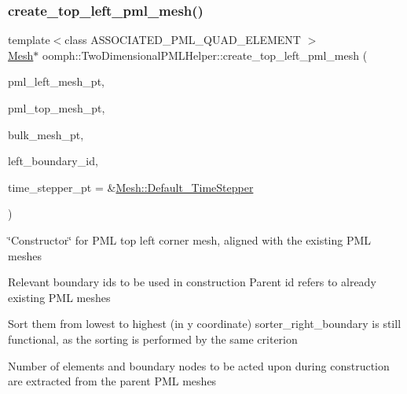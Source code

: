 \mbox{\label{namespaceoomph_1_1TwoDimensionalPMLHelper_a60f24bcfa2ad065577e47d97015995ac}} 
\subsubsection{\texorpdfstring{create\+\_\+top\+\_\+left\+\_\+pml\+\_\+mesh()}{create\_top\_left\_pml\_mesh()}}
{\footnotesize\ttfamily template$<$class A\+S\+S\+O\+C\+I\+A\+T\+E\+D\+\_\+\+P\+M\+L\+\_\+\+Q\+U\+A\+D\+\_\+\+E\+L\+E\+M\+E\+NT $>$ \\
\hyperlink{classoomph_1_1Mesh}{Mesh}$\ast$ oomph\+::\+Two\+Dimensional\+P\+M\+L\+Helper\+::create\+\_\+top\+\_\+left\+\_\+pml\+\_\+mesh (\begin{DoxyParamCaption}\item[{\hyperlink{classoomph_1_1Mesh}{Mesh} $\ast$}]{pml\+\_\+left\+\_\+mesh\+\_\+pt,  }\item[{\hyperlink{classoomph_1_1Mesh}{Mesh} $\ast$}]{pml\+\_\+top\+\_\+mesh\+\_\+pt,  }\item[{\hyperlink{classoomph_1_1Mesh}{Mesh} $\ast$}]{bulk\+\_\+mesh\+\_\+pt,  }\item[{const unsigned \&}]{left\+\_\+boundary\+\_\+id,  }\item[{\hyperlink{classoomph_1_1TimeStepper}{Time\+Stepper} $\ast$}]{time\+\_\+stepper\+\_\+pt = {\ttfamily \&\hyperlink{classoomph_1_1Mesh_a12243d0fee2b1fcee729ee5a4777ea10}{Mesh\+::\+Default\+\_\+\+Time\+Stepper}} }\end{DoxyParamCaption})}



\char`\"{}\+Constructor\char`\"{} for P\+ML top left corner mesh, aligned with the existing P\+ML meshes 

Relevant boundary id\textquotesingle{}s to be used in construction Parent id refers to already existing P\+ML meshes

Sort them from lowest to highest (in y coordinate) sorter\+\_\+right\+\_\+boundary is still functional, as the sorting is performed by the same criterion

Number of elements and boundary nodes to be acted upon during construction are extracted from the \textquotesingle{}parent\textquotesingle{} P\+ML meshes

